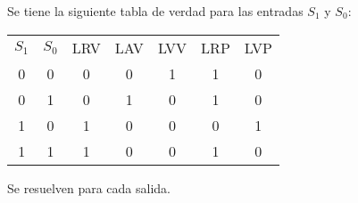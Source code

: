 %
%
%

Se tiene la siguiente tabla de verdad para las entradas $S_1$ y $S_0$:

\begin{table}[H]
  \centering
  \begin{tabular}{c c c c c c c}
    \toprule
    $S_1$ & $S_0$ & LRV & LAV & LVV & LRP & LVP \\ \cmidrule(r){1-2} \cmidrule(l){3-7}
    0     & 0     & 0   & 0   & 1   & 1   & 0  \\ \cmidrule(r){1-2} \cmidrule(l){3-7}
    0     & 1     & 0   & 1   & 0   & 1   & 0  \\ \cmidrule(r){1-2} \cmidrule(l){3-7}
    1     & 0     & 1   & 0   & 0   & 0   & 1  \\ \cmidrule(r){1-2} \cmidrule(l){3-7}
    1     & 1     & 1   & 0   & 0   & 1   & 0  \\
    \bottomrule
  \end{tabular}
\end{table}

Se resuelven para cada salida.

